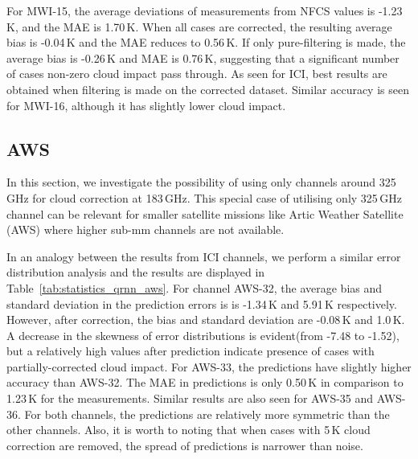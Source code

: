 \documentclass[amt, manuscript]{copernicus}
\begin{document}
For MWI-15, the average deviations of measurements from NFCS values is -1.23\,K, and the MAE is 1.70\,K. When all cases are corrected, the resulting average bias is -0.04\,K and the MAE reduces to 0.56\,K. If only pure-filtering is made, the average bias is -0.26\,K and MAE is 0.76\,K, suggesting that a significant number of cases non-zero cloud impact pass through. As seen for ICI, best results are obtained  when filtering is made on the corrected dataset. 
Similar accuracy is seen for MWI-16, although it has slightly lower cloud impact.




\subsection{AWS}
In this section, we investigate the possibility of using only channels around 325\,GHz for cloud correction at 183\,GHz. This special case of utilising only 325\,GHz channel can be relevant for smaller satellite missions like Artic Weather Satellite (AWS) where higher sub-mm channels are not available. 

In an analogy between the results from ICI channels, we perform a similar error distribution analysis 
and the results are displayed in Table~\ref{tab:statistics_qrnn_aws}. For channel AWS-32, the average bias and standard deviation in the prediction errors is is -1.34\,K and 5.91\,K respectively. However, after correction, the bias and standard deviation are -0.08\,K and 1.0\,K. A decrease in the skewness of error distributions is evident(from -7.48 to -1.52), but a relatively high values after prediction indicate presence of cases with partially-corrected cloud impact. For AWS-33, the predictions have slightly higher accuracy than AWS-32. The MAE in predictions is only 0.50\,K in comparison to 1.23\,K for the measurements. Similar results are also seen for AWS-35 and AWS-36. For both channels, the predictions are relatively more symmetric than the other channels. Also, it is worth to noting that when cases with 5\,K cloud correction are removed, the spread of predictions is narrower than noise. 
\end{document}
